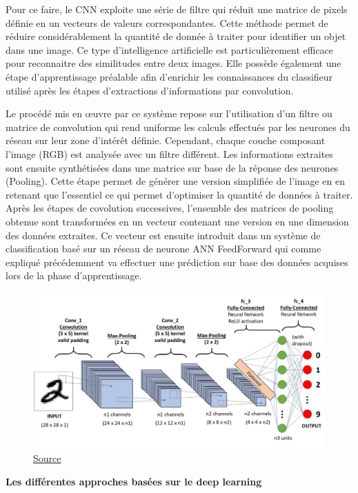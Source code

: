 \documentclass[a4paper,12pt]{article} %
\begin{document}
\par
	Pour ce faire, le CNN exploite une série de filtre qui réduit une matrice de pixels définie en un vecteurs de valeurs correspondantes. Cette méthode permet de réduire considérablement la quantité de donnée à traiter pour identifier un objet dans une image. Ce type d’intelligence artificielle est particulièrement efficace pour reconnaitre des similitudes entre deux images. Elle possède également une étape d’apprentissage préalable afin d’enrichir les connaissances du classifieur utilisé après les étapes d’extractions d’informations par convolution. \newline
\par
Le procédé mis en œuvre par ce système repose sur l’utilisation d’un filtre ou matrice de convolution qui rend uniforme les calculs effectués par les neurones du réseau sur leur zone d’intérêt définie. Cependant, chaque couche composant l’image (RGB) est analysée avec un filtre différent. Les informations extraites sont ensuite synthétisées dans une matrice sur base de la réponse des neurones (Pooling). Cette étape permet de générer une version simplifiée de l’image en en retenant que l’essentiel ce qui permet d’optimiser la quantité de données à traiter. Après les étapes de covolution successives, l’ensemble des matrices de pooling obtenue sont transformées en un vecteur contenant une version en une dimension des données extraites. Ce vecteur est ensuite introduit dans un système de classification basé sur un réseau de neurone ANN FeedForward qui comme expliqué précédemment va effectuer une prédiction sur base des données acquises lors de la phase d’apprentissage. \newline
\begin{figure}[h] %
  \centering %
  \includegraphics[scale=0.20]{CNN.jpeg} %
  \caption{\href{https://towardsdatascience.com/a-comprehensive-guide-to-convolutional-neural-networks-the-eli5-way-3bd2b1164a53}{Source} }
\end{figure}
\newpage
\textbf{Les différentes approches basées sur le deep learning}\newline
\end{document}
